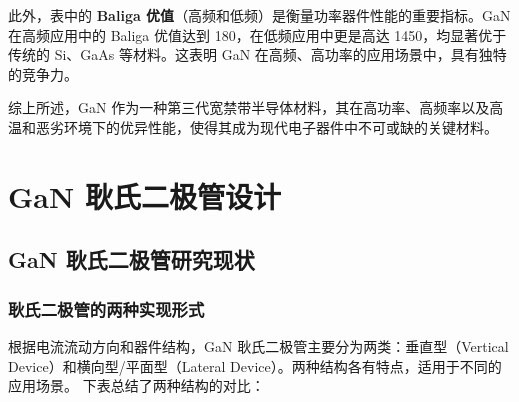 \documentclass[12pt,a4paper]{article}
\begin{document}
此外，表中的 \textbf{Baliga 优值}（高频和低频）是衡量功率器件性能的重要指标。GaN 在高频应用中的 Baliga 优值达到 180，在低频应用中更是高达 1450，均显著优于传统的 Si、GaAs 等材料。这表明 GaN 在高频、高功率的应用场景中，具有独特的竞争力。

综上所述，GaN 作为一种第三代宽禁带半导体材料，其在高功率、高频率以及高温和恶劣环境下的优异性能，使得其成为现代电子器件中不可或缺的关键材料。

\clearpage
\section{GaN 耿氏二极管设计}

\subsection{GaN 耿氏二极管研究现状}

\subsubsection{耿氏二极管的两种实现形式}

根据电流流动方向和器件结构，GaN 耿氏二极管主要分为两类：垂直型（Vertical Device）和横向型/平面型（Lateral Device）。两种结构各有特点，适用于不同的应用场景。
下表总结了两种结构的对比：
\end{document}
